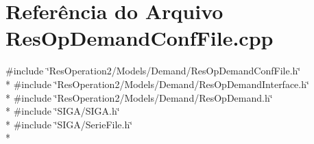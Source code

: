 \section{Referência do Arquivo Res\+Op\+Demand\+Conf\+File.\+cpp}
\label{_res_op_demand_conf_file_8cpp}
{\ttfamily \#include \char`\"{}Res\+Operation2/\+Models/\+Demand/\+Res\+Op\+Demand\+Conf\+File.\+h\char`\"{}}\\*
{\ttfamily \#include \char`\"{}Res\+Operation2/\+Models/\+Demand/\+Res\+Op\+Demand\+Interface.\+h\char`\"{}}\\*
{\ttfamily \#include \char`\"{}Res\+Operation2/\+Models/\+Demand/\+Res\+Op\+Demand.\+h\char`\"{}}\\*
{\ttfamily \#include \char`\"{}S\+I\+G\+A/\+S\+I\+G\+A.\+h\char`\"{}}\\*
{\ttfamily \#include \char`\"{}S\+I\+G\+A/\+Serie\+File.\+h\char`\"{}}\\*
